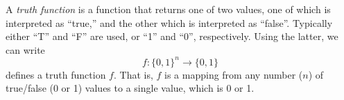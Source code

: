 \documentclass{article}
\begin{document}
A \emph{truth function} is a function that returns one of two values, one of which is interpreted as ``true,'' and the other which is interpreted as ``false''.  Typically either ``T'' and ``F'' are used, or ``1'' and ``0'', respectively.  Using the latter, we can write $$f : \{0,1\}^n \rightarrow \{0,1\}$$
defines a truth function $f$. That is, $f$ is a mapping from any number ($n$) of true/false (0 or 1) values to a single value, which is 0 or 1.
\end{document}

